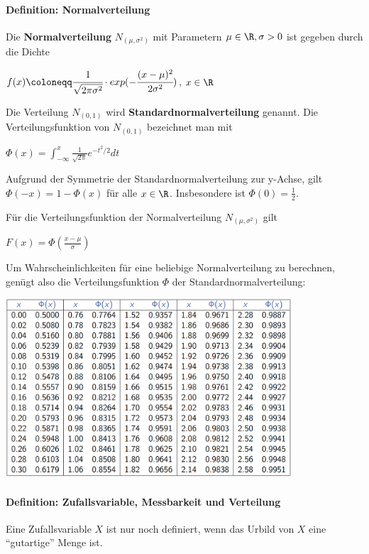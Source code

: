\paragraph{Definition: Normalverteilung}
Die \textbf{Normalverteilung} $N_{(\mu,\sigma^2)}$ mit Parametern $\mu\in\R,\sigma>0$ ist gegeben durch die Dichte
\begin{tightcenter}
	$f(x)\coloneqq\cfrac{1}{\sqrt{2\pi\sigma^2}}\cdot exp(-\cfrac{(x-\mu)^2}{2\sigma^2})$, \qquad$x\in\R$
\end{tightcenter}
Die Verteilung $N_{(0,1)}$ wird \textbf{Standardnormalverteilung} genannt.
Die Verteilungsfunktion von $N_{(0,1)}$ bezeichnet man mit
\begin{tightcenter}
	$\Phi(x)=\int_{-\infty}^{x}\frac{1}{\sqrt{2\pi}}e^{-t^2/2}dt$
\end{tightcenter}
Aufgrund der Symmetrie der Standardnormalverteilung zur y-Achse, gilt\\ $\Phi(-x)=1-\Phi(x)$ für alle $x\in\R$.
Insbesondere ist $\Phi(0)=\frac{1}{2}$.

Für die Verteilungsfunktion der Normalverteilung $N_{(\mu,\sigma^2)}$ gilt
\begin{tightcenter}
	$F(x)=\Phi(\frac{x-\mu}{\sigma})$
\end{tightcenter}
Um Wahrscheinlichkeiten für eine beliebige Normalverteilung zu berechnen, genügt also die Verteilungsfunktion $\Phi$ der Standardnormalverteilung:
\begin{center}
	\includegraphics[width=0.8\textwidth]{images/image2.png}
\end{center}

\paragraph{Definition: Zufallsvariable, Messbarkeit und Verteilung}
Eine Zufallsvariable $X$ ist nur noch definiert, wenn das Urbild von $X$ eine \enquote{gutartige} Menge ist.

